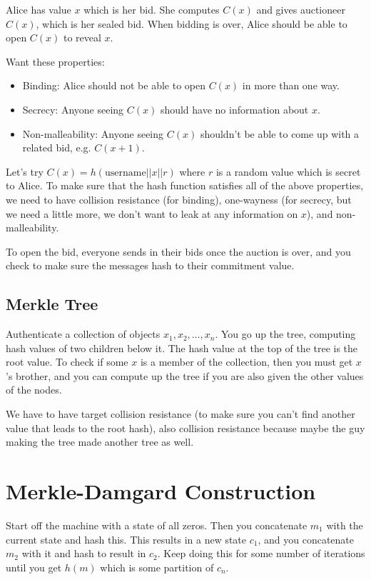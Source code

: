 \documentclass[psamsfonts]{amsart}
\begin{document}
Alice has value $x$ which is her bid. She computes $C(x)$ and gives auctioneer $C(x)$, which is her sealed bid. When bidding is over, Alice should be able to open $C(x)$ to reveal $x$.

Want these properties:
\begin{itemize}
  \item Binding: Alice should not be able to open $C(x)$ in more than one way.
  \item Secrecy: Anyone seeing $C(x)$ should have no information about $x$.
  \item Non-malleability: Anyone seeing $C(x)$ shouldn't be able to come up with a related bid, e.g. $C(x+1)$.
\end{itemize}

Let's try $C(x) = h(\textrm{username} || x || r)$ where $r$ is a random value which is secret to Alice. To make sure that the hash function satisfies all of the above properties, we need to have collision resistance (for binding), one-wayness (for secrecy, but we need a little more, we don't want to leak at any information on $x$), and non-malleability.

To open the bid, everyone sends in their bids once the auction is over, and you check to make sure the messages hash to their commitment value.

\subsection{Merkle Tree}

Authenticate a collection of objects $x_1, x_2, \ldots, x_n$. You go up the tree, computing hash values of two children below it. The hash value at the top of the tree is the root value. To check if some $x$ is a member of the collection, then you must get $x$'s brother, and you can compute up the tree if you are also given the other values of the nodes.

We have to have target collision resistance (to make sure you can't find another value that leads to the root hash), also collision resistance because maybe the guy making the tree made another tree as well.

\section{Merkle-Damgard Construction}

Start off the machine with a state of all zeros. Then you concatenate $m_1$ with the current state and hash this. This results in a new state $c_1$, and you concatenate $m_2$ with it and hash to result in $c_2$. Keep doing this for some number of iterations until you get $h(m)$ which is some partition of $c_n$.
\end{document}

